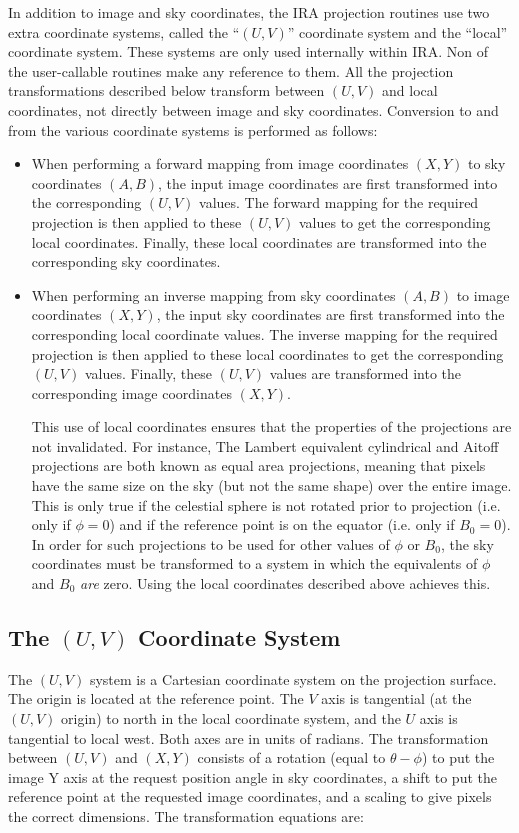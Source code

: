 In addition to image and sky coordinates, the IRA projection routines use two
extra coordinate systems, called the ``$(U,V)$'' coordinate system and the
``local'' coordinate system. These systems are only used internally within
IRA. Non of the user-callable routines make any reference to them. All the
projection transformations described below transform between $(U,V)$ and local
coordinates, not directly between image and sky coordinates. Conversion to and
from the various coordinate systems is performed as follows:

\begin{itemize}

\item When performing a forward mapping from image coordinates $(X,Y)$ to sky
coordinates $(A,B)$, the input image coordinates are first transformed into the
corresponding $(U,V)$ values. The forward mapping for the required projection is
then applied to these $(U,V)$ values to get the corresponding local coordinates.
Finally, these local coordinates are transformed into the corresponding sky
coordinates.

\item When performing an inverse mapping from sky coordinates $(A,B)$ to image
coordinates $(X,Y)$, the input sky coordinates are first transformed into
the corresponding local coordinate values. The inverse mapping for the required
projection is then applied to these local coordinates to get the corresponding
$(U,V)$ values. Finally, these $(U,V)$ values are transformed into the
corresponding image coordinates $(X,Y)$.

This use of local coordinates ensures that the properties of the projections are
not invalidated. For instance, The Lambert equivalent cylindrical and Aitoff
projections are both known as equal area projections, meaning that pixels have
the same size on the sky (but not the same shape) over the entire image. This is
only true if the celestial sphere is not rotated prior to projection (i.e. only
if $\phi=0$) and if the reference point is on the equator (i.e. only if
$B_{0}=0$). In order for such projections to be used for other values of $\phi$
or $B_{0}$, the sky coordinates must be transformed to a system in which the
equivalents of $\phi$ and $B_{0}$ {\em are} zero. Using the local coordinates
described above achieves this.

\end{itemize}

\subsection {The $(U,V)$ Coordinate System}
The $(U,V)$ system is a Cartesian coordinate system on the projection surface.
The origin is located at the reference point. The $V$ axis is tangential (at the
$(U,V)$ origin) to north in the local coordinate system, and the $U$ axis is
tangential to local west. Both axes are in units of radians. The transformation
between $(U,V)$ and $(X,Y)$ consists of a rotation (equal to $\theta-\phi$) to
put the image Y axis at the request position angle in sky coordinates, a shift
to put the reference point at the requested image coordinates, and a scaling to
give pixels the correct dimensions. The transformation equations are:

